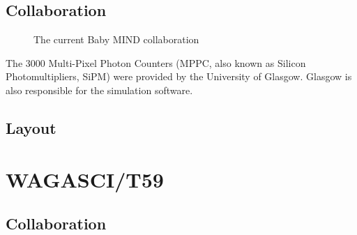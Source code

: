 \subsection{Collaboration}

\begin{figure}[h!]
\centering
{}
\caption{The current Baby MIND collaboration}
\label{fig:collaboration}
\end{figure}

The 3000 Multi-Pixel Photon Counters (MPPC, also known as Silicon Photomultipliers, SiPM) were provided by the University of Glasgow. Glasgow is also responsible for the simulation software.
\subsection{Layout}


\section{WAGASCI/T59}


\subsection{Collaboration}

